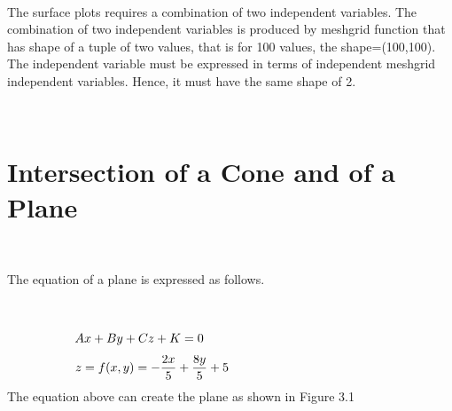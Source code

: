 \documentclass[10pt,a4paper,leqno]{article}
\begin{document}
\begin{CJK*}{UTF8}{gbsn}
 \par \ \par\noindent The surface plots requires a combination of two independent variables. The combination of two independent variables is produced by meshgrid function that has shape of a tuple of two values, that is for 100 values, the shape=(100,100). The independent variable must be expressed in terms of independent meshgrid independent variables. Hence, it must have the same shape of 2.
 \par \ \par\noindent \section{Intersection of a Cone and of a Plane }
 \par \ \par\noindent The equation of a plane is expressed as follows.
 \par \ \par\begin{equation}
 \begin{minipage}{250pt}
                \begin{flushleft} $\displaystyle A x + B y + C z + K = 0$  \end{flushleft}
 \end{minipage}
 \end{equation}
\begin{equation}
 \begin{minipage}{250pt}
                \begin{flushleft} $\displaystyle z = f{\left(x,y \right)} = - \frac{2 x}{5} + \frac{8 y}{5} + 5$  \end{flushleft}
 \end{minipage}
 \end{equation}
\noindent The equation above can create the plane as shown in Figure 3.1
 \par \ \par\begin{figure}[H]

\end{figure}
\end{CJK*}
\end{document}
